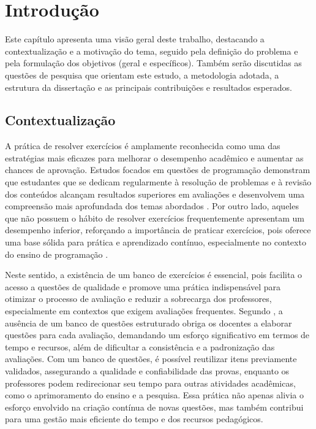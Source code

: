 \chapter{Introdução}\label{cap:modelo}

Este capítulo apresenta uma visão geral deste trabalho, destacando a contextualização e a motivação do tema, seguido pela definição do problema e pela formulação dos objetivos (geral e específicos). Também serão discutidas as questões de pesquisa que orientam este estudo, a metodologia adotada, a estrutura da dissertação e as principais contribuições e resultados esperados. 

\section{Contextualização}

A prática de resolver exercícios é amplamente reconhecida como uma das estratégias mais eficazes para melhorar o desempenho acadêmico e aumentar as chances de aprovação. Estudos focados em questões de programação demonstram que estudantes que se dedicam regularmente à resolução de problemas e à revisão dos conteúdos alcançam resultados superiores em avaliações e desenvolvem uma compreensão mais aprofundada dos temas abordados \parencite{Ahadi2016}. Por outro lado,  aqueles que não possuem o hábito de resolver exercícios frequentemente apresentam um desempenho inferior, reforçando a importância de praticar exercícios, pois oferece uma base sólida para prática e aprendizado contínuo,  especialmente no contexto do ensino de programação \parencite{Edwards2019}.  

Neste sentido, a existência de um banco de exercícios é essencial, pois facilita o acesso a questões de qualidade e promove uma prática indispensável para otimizar o processo de avaliação e reduzir a sobrecarga dos professores, especialmente em contextos que exigem avaliações frequentes. Segundo   \parencite{Puthiaparampil2020} , a ausência de um banco de questões estruturado obriga os docentes a elaborar questões  para cada avaliação, demandando um esforço significativo em termos de tempo e recursos, além de dificultar a consistência e a padronização das avaliações. Com um banco de questões, é possível reutilizar itens previamente validados, assegurando a qualidade e confiabilidade das provas, enquanto os professores podem redirecionar seu tempo para outras atividades acadêmicas, como o aprimoramento do ensino e a pesquisa. Essa prática não apenas alivia o esforço envolvido na criação contínua de novas questões, mas também contribui para uma gestão mais eficiente do tempo e dos recursos pedagógicos. 

